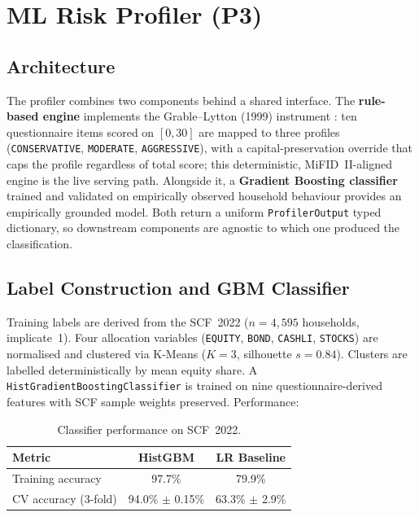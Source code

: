 \documentclass[11pt, a4paper]{article}
\begin{document}
\section{ML Risk Profiler (P3)}

\subsection{Architecture}
The profiler combines two components behind a shared interface. The \textbf{rule-based engine} implements the Grable--Lytton (1999) instrument \parencite{grable1999}: ten questionnaire items scored on $[0,30]$ are mapped to three profiles (\texttt{CONSERVATIVE}, \texttt{MODERATE}, \texttt{AGGRESSIVE}), with a capital-preservation override that caps the profile regardless of total score; this deterministic, MiFID~II-aligned engine is the live serving path. Alongside it, a \textbf{Gradient Boosting classifier} trained and validated on empirically observed household behaviour provides an empirically grounded model. Both return a uniform \texttt{ProfilerOutput} typed dictionary, so downstream components are agnostic to which one produced the classification.

\subsection{Label Construction and GBM Classifier}
Training labels are derived from the SCF~2022 \parencite{FedSCF2022} ($n=4{,}595$ households, implicate~1). Four allocation variables (\texttt{EQUITY}, \texttt{BOND}, \texttt{CASHLI}, \texttt{STOCKS}) are normalised and clustered via K-Means ($K=3$, silhouette $s=0.84$). Clusters are labelled deterministically by mean equity share. A \texttt{HistGradientBoostingClassifier} is trained on nine questionnaire-derived features with SCF sample weights preserved. Performance:

\begin{table}[H]
\centering\small
\begin{tabular}{lcc}
\toprule
\textbf{Metric} & \textbf{HistGBM} & \textbf{LR Baseline} \\
\midrule
Training accuracy    & 97.7\% & 79.9\% \\
CV accuracy (3-fold) & 94.0\% $\pm$ 0.15\% & 63.3\% $\pm$ 2.9\% \\
\bottomrule
\end{tabular}
\caption{Classifier performance on SCF~2022.}
\end{table}
\end{document}
